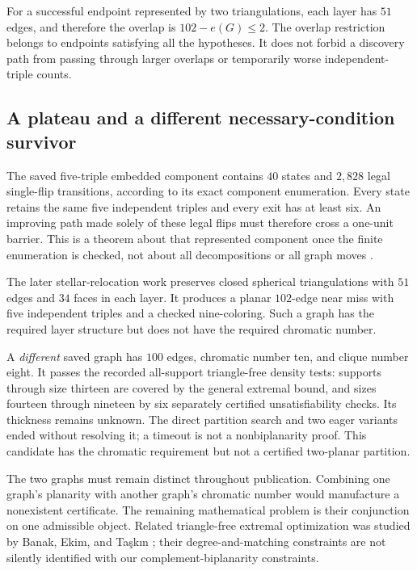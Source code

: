 \documentclass[11pt,letterpaper]{article}
\theoremstyle{definition}
\theoremstyle{remark}\newtheorem{remark}[theorem]{Remark}
\begin{document}
For a successful endpoint represented by two triangulations, each layer has $51$ edges, and therefore the overlap is $102-e(G)\leq2$. The overlap restriction belongs to endpoints satisfying all the hypotheses. It does not forbid a discovery path from passing through larger overlaps or temporarily worse independent-triple counts.

\subsection{A plateau and a different necessary-condition survivor}
The saved five-triple embedded component contains $40$ states and $2,828$ legal single-flip transitions, according to its exact component enumeration. Every state retains the same five independent triples and every exit has at least six. An improving path made solely of these legal flips must therefore cross a one-unit barrier. This is a theorem about that represented component once the finite enumeration is checked, not about all decompositions or all graph moves \cite{BeasleyC5}.

The later stellar-relocation work preserves closed spherical triangulations with $51$ edges and $34$ faces in each layer. It produces a planar $102$-edge near miss with five independent triples and a checked nine-coloring. Such a graph has the required layer structure but does not have the required chromatic number.

A \emph{different} saved graph has $100$ edges, chromatic number ten, and clique number eight. It passes the recorded all-support triangle-free density tests: supports through size thirteen are covered by the general extremal bound, and sizes fourteen through nineteen by six separately certified unsatisfiability checks. Its thickness remains unknown. The direct partition search and two eager variants ended without resolving it; a timeout is not a nonbiplanarity proof. This candidate has the chromatic requirement but not a certified two-planar partition.

The two graphs must remain distinct throughout publication. Combining one graph's planarity with another graph's chromatic number would manufacture a nonexistent certificate. The remaining mathematical problem is their conjunction on one admissible object. Related triangle-free extremal optimization was studied by Banak, Ekim, and Ta\c{s}k\i n \cite{Banak}; their degree-and-matching constraints are not silently identified with our complement-biplanarity constraints.
\end{document}
